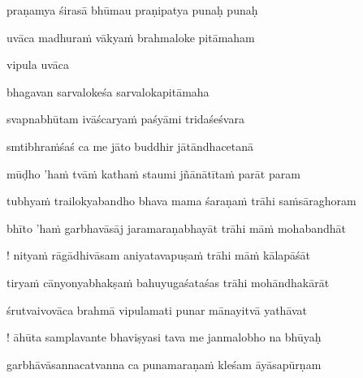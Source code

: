 praṇamya śirasā bhūmau praṇipatya punaḥ punaḥ\thinspace{\dandab} \dontdisplaylinenum

uvāca madhura\.m vākya\.m brahmaloke pitāmaham \veg\dontdisplaylinenum

vipula uvāca~{\dandab}\dontdisplaylinenum 

bhagavan sarvalokeśa sarvalokapitāmaha\thinspace{\danda} \dontdisplaylinenum

svapnabhūtam ivāścarya\.m paśyāmi tridaśeśvara \veg\dontdisplaylinenum

smtibhra\.mśaś ca me jāto buddhir jātāndhacetanā\thinspace{\dandab} \dontdisplaylinenum

mūḍho 'ha\.m tvā\.m katha\.m staumi jñānātīta\.m parāt param \veg\dontdisplaylinenum
            \var{\vcd \om\ \msCa}%

\ujvers\nemsloka 
tubhya\.m trailokyabandho bhava mama śaraṇa\.m trāhi sa\.msāraghoram
\dontdisplaylinenum

\nemslokab 
bhīto 'ha\.m garbhavāsāj jaramaraṇabhayāt trāhi mā\.m mohabandhāt \danda\dontdisplaylinenum

\nemslokac 
! nitya\.m rāgādhivāsam aniyatavapuṣa\.m trāhi mā\.m kālapāśāt
\dontdisplaylinenum

\nemslokad 
tirya\.m cānyonyabhakṣa\.m bahuyugaśataśas trāhi mohāndhakārāt \veg\dontdisplaylinenum

\ujvers\nemsloka 
śrutvaivovāca brahmā vipulamati punar mānayitvā yathāvat
\dontdisplaylinenum

\nemslokab 
! āhūta samplavante bhaviṣyasi tava me janmalobho na bhūyaḥ \danda\dontdisplaylinenum

\nemslokac 
garbhāvāsannacatvanna ca punamaraṇa\.m kleśam āyāsapūrṇam
\dontdisplaylinenum

